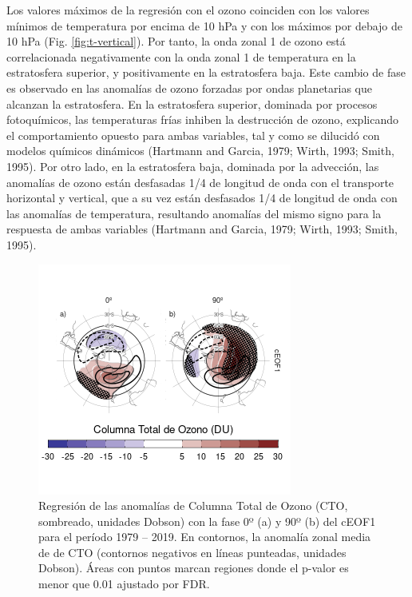 \documentclass[12pt,oneside]{reedthesis}
\begin{document}
Los valores máximos de la regresión con el ozono coinciden con los valores mínimos de temperatura por encima de 10 hPa y con los máximos por debajo de 10 hPa (Fig. \ref{fig:t-vertical}).
Por tanto, la onda zonal 1 de ozono está correlacionada negativamente con la onda zonal 1 de temperatura en la estratosfera superior, y positivamente en la estratosfera baja.
Este cambio de fase es observado en las anomalías de ozono forzadas por ondas planetarias que alcanzan la estratosfera.
En la estratosfera superior, dominada por procesos fotoquímicos, las temperaturas frías inhiben la destrucción de ozono, explicando el comportamiento opuesto para ambas variables, tal y como se dilucidó con modelos químicos dinámicos (Hartmann and Garcia, 1979; Wirth, 1993; Smith, 1995).
Por otro lado, en la estratosfera baja, dominada por la advección, las anomalías de ozono están desfasadas 1/4 de longitud de onda con el transporte horizontal y vertical, que a su vez están desfasados 1/4 de longitud de onda con las anomalías de temperatura, resultando anomalías del mismo signo para la respuesta de ambas variables (Hartmann and Garcia, 1979; Wirth, 1993; Smith, 1995).





\begin{figure}
\includegraphics{figures/20-ceofs/o3-regr-1} \caption{Regresión de las anomalías de Columna Total de Ozono (CTO, sombreado, unidades Dobson) con la fase 0º (a) y 90º (b) del cEOF1 para el período 1979 -- 2019.
En contornos, la anomalía zonal media de de CTO (contornos negativos en líneas punteadas, unidades Dobson).
Áreas con puntos marcan regiones donde el p-valor es menor que 0.01 ajustado por FDR.}\label{fig:o3-regr}
\end{figure}
\end{document}
